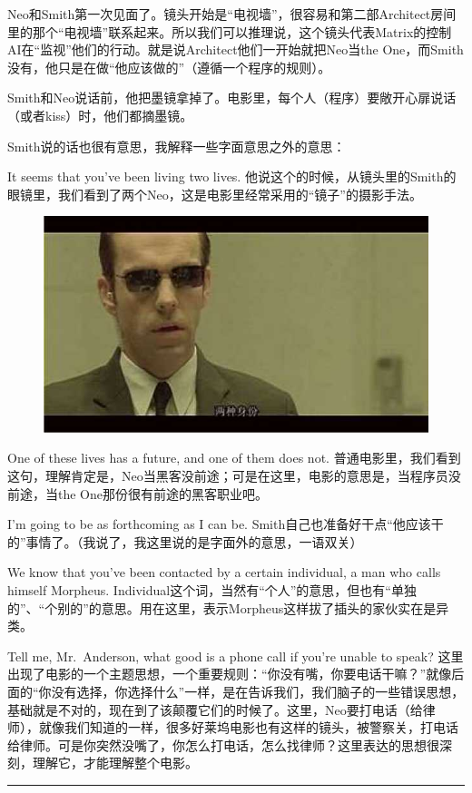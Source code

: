 \documentclass[UTF8]{ctexart}
\newcommand{\myparsep}{\noindent \rule[0.5ex]{\linewidth}{1pt}}
\begin{document}
Neo和Smith第一次见面了。镜头开始是“电视墙”，很容易和第二部Architect房间里的那个“电视墙”联系起来。所以我们可以推理说，这个镜头代表Matrix的控制AI在“监视”他们的行动。就是说Architect他们一开始就把Neo当the One，而Smith没有，他只是在做“他应该做的”（遵循一个程序的规则）。

Smith和Neo说话前，他把墨镜拿掉了。电影里，每个人（程序）要敞开心扉说话（或者kiss）时，他们都摘墨镜。

Smith说的话也很有意思，我解释一些字面意思之外的意思：

It seems that you've been living two lives. 他说这个的时候，从镜头里的Smith的眼镜里，我们看到了两个Neo，这是电影里经常采用的“镜子”的摄影手法。

\begin{figure}[htb]
\centering
\includegraphics[width=0.5\linewidth]{fig/read_Matrix-16}
\end{figure}

One of these lives has a future, and one of them does not. 普通电影里，我们看到这句，理解肯定是，Neo当黑客没前途；可是在这里，电影的意思是，当程序员没前途，当the One那份很有前途的黑客职业吧。

I'm going to be as forthcoming as I can be. Smith自己也准备好干点“他应该干的”事情了。（我说了，我这里说的是字面外的意思，一语双关）

We know that you've been contacted by a certain individual, a man who calls himself Morpheus. Individual这个词，当然有“个人”的意思，但也有“单独的”、“个别的”的意思。用在这里，表示Morpheus这样拔了插头的家伙实在是异类。

Tell me, Mr.~Anderson, what good is a phone call if you're unable to speak? 这里出现了电影的一个主题思想，一个重要规则：“你没有嘴，你要电话干嘛？”就像后面的“你没有选择，你选择什么”一样，是在告诉我们，我们脑子的一些错误思想，基础就是不对的，现在到了该颠覆它们的时候了。这里，Neo要打电话（给律师），就像我们知道的一样，很多好莱坞电影也有这样的镜头，被警察关，打电话给律师。可是你突然没嘴了，你怎么打电话，怎么找律师？这里表达的思想很深刻，理解它，才能理解整个电影。

\myparsep
\end{document}
